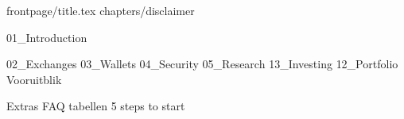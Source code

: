 \documentclass[dutch, a4paper, 11pt, oneside, hyphens]{book}
\begin{document}
\frontmatter


{frontpage/title.tex}
{chapters/disclaimer}

\clearpage




\begingroup
\pagestyle{plain}
\tableofcontents
\listoffigures
{}
\listoftables
{}
\endgroup

\mainmatter

\pagestyle{fancy}

{01_Introduction}
{02_Exchanges}
{03_Wallets}
{04_Security}
{05_Research}
{13_Investing}
{12_Portfolio}
{Vooruitblik}


\appendix
{Extras}
{FAQ}
{tabellen}
{5 steps to start}

\backmatter

\printbibliography

\printendnotes
\end{document}
